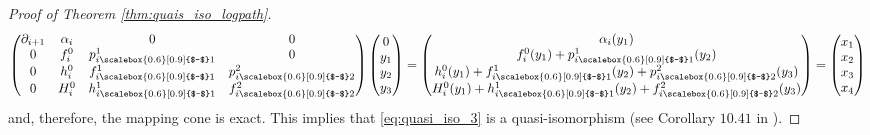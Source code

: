 \documentclass[11pt]{article}
\newcommand{\minus}{\mathbin{\scalebox{0.6}[0.9]{$-$}}}
\begin{document}
\begin{proof}[Proof of Theorem \ref{thm:quais_iso_logpath}]
\begin{equation*}
\begin{pmatrix} \partial_{i+1} & \alpha_{i} & 0 & 0 \\ 0 & f^0_{i} & p_{i\minus 1}^1 & 0 \\ 0 & h_{i}^0 & f_{i\minus 1}^1 & p_{i\minus 2}^2 \\ 0 & H_{i}^0 & h_{i\minus 1}^1 & f_{i\minus 2}^2 \end{pmatrix}\begin{pmatrix}0\\y_1\\y_2\\y_3\end{pmatrix}=\begin{pmatrix}\alpha_i(y_1)\\f_i^0(y_1)+p_{i\minus 1}^1(y_2)\\h_{i}^0(y_1)+f_{i\minus 1}^1(y_2)+p_{i\minus 2}^2(y_3)\\H_i^0(y_1)+h_{i\minus 1}^1(y_2)+f_{i\minus 2}^2(y_3)\end{pmatrix}=\begin{pmatrix}x_1\\x_2\\x_3\\x_4\end{pmatrix}
\end{equation*}
and, therefore, the mapping cone is exact. This implies that \eqref{eq:quasi_iso_3} is a quasi-isomorphism (see Corollary $10.41$ in \cite{rotman}).
\end{proof}
%
%
%
%
\end{document}
